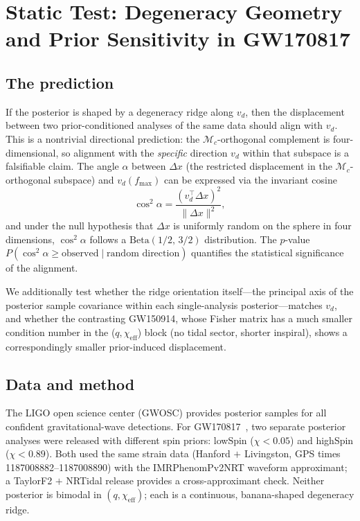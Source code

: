 \documentclass[twocolumn,prd,showpacs,superscriptaddress]{revtex4-2}
\newcommand{\chieff}{\chi_{\text{eff}}}
\newcommand{\vd}{v_{d}}          %
\begin{document}
\section{Static Test: Degeneracy Geometry and Prior Sensitivity in GW170817}
\label{sec:static}

\subsection{The prediction}

If the posterior is shaped by a degeneracy ridge along $\vd$, then the
displacement between two prior-conditioned analyses of the same data
should align with $\vd$.  This is a nontrivial directional prediction:
the $\mathcal{M}_c$-orthogonal complement is four-dimensional, so
alignment with the \emph{specific} direction $\vd$ within that subspace
is a falsifiable claim.  The angle $\alpha$ between $\Delta x$ (the
restricted displacement in the $\mathcal{M}_c$-orthogonal subspace) and
$\vd(f_{\text{max}})$ can be expressed via the invariant cosine
\begin{equation}
\cos^2\alpha = \frac{(\vd^{\top}\Delta x)^2}{\|\Delta x\|^2},
\label{eq:cos2alpha}
\end{equation}
and under the null hypothesis that $\Delta x$ is uniformly random on
the sphere in four dimensions, $\cos^2\alpha$ follows a
$\mathrm{Beta}(1/2,\, 3/2)$ distribution.  The $p$-value
$P(\cos^2\alpha \ge \text{observed} \mid \text{random direction})$
quantifies the statistical significance of the alignment.

We additionally test whether the ridge orientation itself---the
principal axis of the posterior sample covariance within each
single-analysis posterior---matches $\vd$, and whether the contrasting
GW150914, whose Fisher matrix has a much smaller condition number in
the ($q, \chieff$) block (no tidal sector, shorter inspiral), shows a
correspondingly smaller prior-induced displacement.

\subsection{Data and method}

The LIGO open science center (GWOSC) provides posterior samples for
all confident gravitational-wave detections.  For
GW170817~\cite{abbott2017gw170817,abbott2019gw170817_params}, two
separate posterior analyses were released with different spin priors:
lowSpin ($\chi < 0.05$) and highSpin ($\chi < 0.89$).  Both used the
same strain data (Hanford $+$ Livingston, GPS times
1187008882--1187008890) with the IMRPhenomPv2NRT waveform approximant;
a TaylorF2 $+$ NRTidal release provides a cross-approximant check.
Neither posterior is bimodal in $(q, \chieff)$; each is a continuous,
banana-shaped degeneracy ridge.
\end{document}

